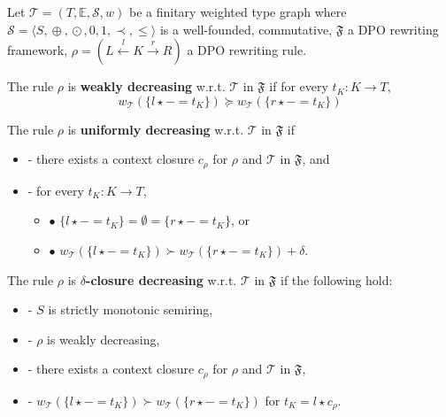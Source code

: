 \begin{definition}
    \label{def:decreasing_rule}
    Let $\mathcal{T} \mathop{=} (T,\mathbb{E},\mathcal{S}, w)$ be a finitary weighted type graph where $\mathcal{S}=\langle S, \mathop{\oplus}, \mathop{\odot}, 0, 1, \prec, \leq \rangle$ is a well-founded, commutative, \(\mathfrak{F}\) a DPO rewriting framework, $\rho \mathop{=} (L \overset{l}{\leftarrow} K \overset{r}{\rightarrow} R)$ a DPO rewriting rule. 

    \noindent
    The rule $\rho$ is \textbf{weakly decreasing} w.r.t. $\mathcal{T}$ in $\mathfrak{F}$ if 
            for every $t_K : K \mathop{\to} T$,
                $$ 
                  w_\mathcal{T}(\{l \mathop{\star} - \mathop{=} t_K\}) \mathop{\succeq} w_\mathcal{T}(\{r\star - \mathop{=} t_K\})$$
           
    \noindent
    The rule $\rho$ is \textbf{uniformly decreasing} w.r.t. $\mathcal{T}$ in $\mathfrak{F}$ if
        \begin{itemize}
            \item[]- there exists a context closure $c_\rho$ for $\rho$ and $\mathcal{T}$ in $\mathfrak{F}$, and
            \item[]- for every $t_K : K \mathop{\to} T$,
            \begin{itemize}
                \item[] $\bullet$ $\{l \mathop{\star} - \mathop{=} t_K\} \mathop{=} \emptyset \mathop{=} \{r \mathop{\star} - \mathop{=} t_K\}$, or
                \item[] $\bullet$ $w_\mathcal{T}(\{l \mathop{\star} - \mathop{=} t_K\}) \mathop{\succ}    w_\mathcal{T}(\{r \mathop{\star} - \mathop{=} t_K\})\mathop{+}\delta$.
            \end{itemize}
        \end{itemize}  
         
    \noindent
    The rule $\rho$ is
            \textbf{$\delta$-closure decreasing} w.r.t. $\mathcal{T}$ in $\mathfrak{F}$ if the following hold:
            \begin{itemize}
                \item[]- $S$ is strictly monotonic semiring,
                \item[]- $\rho$ is weakly decreasing,
                \item[]- there exists a context closure $c_\rho$ for $\rho$ and $\mathcal{T}$ in $\mathfrak{F}$,
                \item[]- $w_\mathcal{T}(\{l \mathop{\star} - \mathop{=} t_K\}) \mathop{\succ}  w_\mathcal{T}(\{r \mathop{\star} - \mathop{=} t_K\})$ for $t_K \mathop{=} l \mathop{\star} c_\rho$.
            \end{itemize}
\end{definition}

